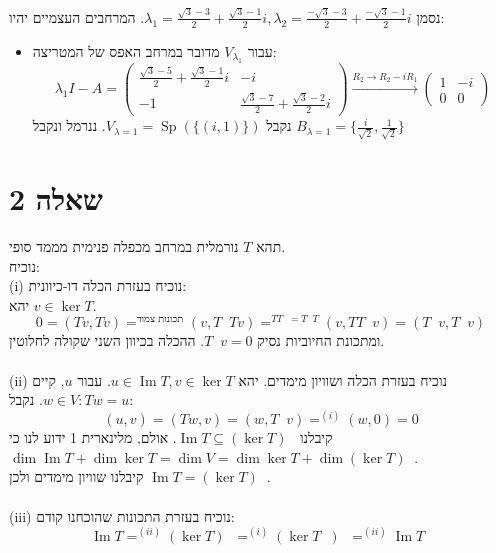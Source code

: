 \documentclass{article}
\DeclareMathOperator*{\equals}{=}
\DeclareMathOperator{\adj}{^\ast}
\DeclareMathOperator{\perc}{^\perp}
\DeclareMathOperator{\Sp}{Sp}
\DeclareMathOperator{\Image}{Im}
\begin{document}
נסמן $\lambda_1=\frac{\sqrt{3}-3}{2}+\frac{\sqrt{3}-1}{2}i, \lambda_2=\frac{-\sqrt{3}-3}{2}+\frac{-\sqrt{3}-1}{2}i$. המרחבים העצמיים יהיו:
\begin{itemize}
    \item עבור $V_{\lambda_1}$ מדובר במרחב האפס של המטריצה: \\
          \[
              \lambda_1I-A=\begin{pmatrix}
                  \frac{\sqrt{3}-5}{2}+\frac{\sqrt{3}-1}{2}i & -i                                         \\
                  -1                                         & \frac{\sqrt{3}-7}{2}+\frac{\sqrt{3}-2}{2}i
              \end{pmatrix}\xrightarrow{R_2\rightarrow R_2-iR_1}
              \begin{pmatrix}
                  1 & -i \\
                  0 & 0
              \end{pmatrix}
          \]
          נקבל $V_{\lambda=1}=\Sp(\{ (i, 1) \})$.
          ננרמל ונקבל $B_{\lambda=1}=\{ \frac{i}{\sqrt{2}}, \frac{1}{\sqrt{2}} \}$
\end{itemize}

\pagebreak

\section*{שאלה 2}

תהא $T$ נורמלית במרחב מכפלה פנימית מממד סופי. \\
נוכיח: \\
(i) נוכיח בעזרת הכלה דו-כיוונית: \\
יהא $v\in \ker T$.
\[
    0=(Tv,Tv)\equals^{\text{תכונות צמוד}}(v, T\adj T v)\equals^{TT\adj = T \adj T}(v, TT\adj v)=(T \adj v, T \adj v)
\]
ומתכונת החיוביות נסיק $T \adj v=0$. ההכלה בכיוון השני שקולה לחלוטין. \\\\
(ii) נוכיח בעזרת הכלה ושוויון מימדים.
יהא $u\in \Image T, v\in \ker T$. עבור $u$, קיים $w\in V: Tw=u$. נקבל:
\[
    (u,v)=(Tw, v)=(w, T \adj v)\equals^{(i)}(w,0)=0
\]
קיבלנו $\Image T \subseteq (\ker T) \perc$.
אולם, מלינארית 1 ידוע לנו כי $\dim \Image T + \dim \ker T = \dim V = \dim \ker T + \dim (\ker T) \perc$. \\
קיבלנו שוויון מימדים ולכן $\Image T = (\ker T)\perc$.\\\\
(iii) נוכיח בעזרת התכונות שהוכחנו קודם:
\[
    \Image T \equals^{(ii)} (\ker T) \perc \equals^{(i)} (\ker T \adj) \perc \equals^{(ii)} \Image T \adj
\]
\end{document}
